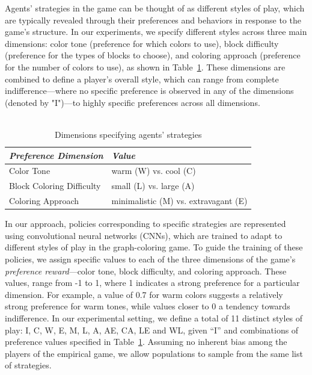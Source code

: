\begin{flushleft}
\begin{flushleft}
        Agents' strategies in the game can be thought of as different styles of play, which are typically revealed through their preferences and behaviors in response to the game’s structure. In our experiments, we specify different styles across three main dimensions: color tone (preference for which colors to use), block difficulty (preference for the types of blocks to choose), and coloring approach (preference for the number of colors to use), as shown in Table~\ref{tab:preferences}. These dimensions are combined to define a player's overall style, which can range from complete indifference—where no specific preference is observed in any of the dimensions (denoted by "I")—to highly specific preferences across all dimensions.\\~\\
        \begin{table}[H]
            \centering
            \caption{Dimensions specifying agents' strategies}
            \label{tab:preferences}
            \vspace{0.5em}
            \begin{tabular}{ll}
                \toprule
                \textit{Preference Dimension} & \textit{Value} \\ 
                \midrule
                Color Tone & warm (W) vs. cool (C) \\ 
                Block Coloring Difficulty & small (L) vs. large (A) \\ 
                Coloring Approach & minimalistic (M) vs. extravagant (E) \\ 
                \bottomrule
            \end{tabular}
        \end{table}
       
        In our approach, policies corresponding to specific strategies are represented using convolutional neural networks (CNNs), which are trained to adapt to different styles of play in the graph-coloring game. To guide the training of these policies, we assign specific values to each of the three dimensions of the game's \emph{preference reward}—color tone, block difficulty, and coloring approach. These values, range from -1 to 1, where 1 indicates a strong preference for a particular dimension. For example, a value of 0.7 for warm colors suggests a relatively strong preference for warm tones, while values closer to 0 a tendency towards indifference. In our experimental setting, we define a total of 11 distinct styles of play: I, C, W, E, M, L, A, AE, CA, LE and WL, given ``I'' and combinations of preference values specified in Table~\ref{tab:preferences}. Assuming no inherent bias among the players of the empirical game, we allow populations to sample from the same list of strategies.


\end{flushleft}
\end{flushleft}
